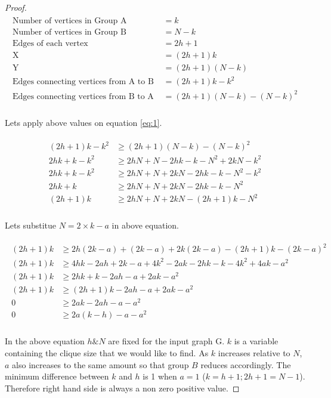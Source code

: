 \documentclass[12pt]{article}
\theoremstyle{plain}
\theoremstyle{definition}
\begin{document}
\begin{proof}
	
\begin{align} 
\begin{split}
\text{Number of vertices in Group A} &= k \\
\text{Number of vertices in Group B} &= N - k \\
\text{Edges of each vertex} &= 2h + 1 \\
\text{X} &= (2h+1)k \\
\text{Y} &= (2h+1)(N - k) \\
\text{Edges connecting vertices from A to B } &= (2h+1)k - k^2 \\
\text{Edges connecting vertices from B to A } &= (2h+1)(N - k) - (N - k)^2 \\
\end{split}
\end{align}

Lets apply above values on equation \eqref{eq:1}.

	
\begin{align} 
\begin{split}
(2h + 1)k - k^2 &\ge (2h+1)(N - k) - (N - k)^2 \\
2hk + k - k^2 &\ge 2hN + N - 2hk - k - N^2 + 2kN - k^2 \\
2hk + k - k^2 &\ge 2hN + N + 2kN - 2hk - k - N^2 - k^2 \\
2hk + k &\ge 2hN + N + 2kN - 2hk - k - N^2 \\
(2h+1)k &\ge 2hN + N + 2kN - (2h + 1)k - N^2 \\
\end{split}
\end{align}

Lets substitue $N = 2 \times k - a$ in above equation.

\begin{align} 
\begin{split}
(2h+1)k &\ge 2h(2k-a) + (2k-a) + 2k(2k-a) - (2h + 1)k - (2k-a)^2 \\
(2h+1)k &\ge 4hk-2ah + 2k-a + 4k^2-2ak - 2hk - k - 4k^2 + 4ak -a^2 \\
(2h+1)k &\ge 2hk + k - 2ah - a + 2ak -a^2 \\
(2h+1)k &\ge (2h+1)k - 2ah - a + 2ak -a^2 \\
0 &\ge 2ak - 2ah - a-a^2 \\
0 &\ge 2a(k-h) - a-a^2 \\
\end{split}
\end{align}

In the above equation $h \& N$ are fixed for the input graph G. $k$ is a variable containing the clique size that we would like to find. As $k$ increases relative to $N$, $a$ also increases to the same amount so that group $B$ reduces accordingly. The minimum difference between $k$ and $h$ is 1 when $a = 1$ ($k = h + 1; 2h+1=N -1$). Therefore right hand side is always a non zero positive value.
\end{proof}
\end{document}
